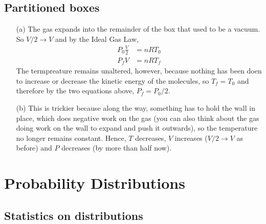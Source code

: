 \documentclass{article}
\begin{document}
\subsection{Partitioned boxes}

\begin{itemize}
	\item[(a)] The gas expands into the remainder of the box that used to be a vacuum. So $V/2\rightarrow V$ and by the Ideal Gas Law,
	\begin{align*}
	P_0\frac{V}{2}&=nRT_0 \\
	P_fV &= nRT_f
	\end{align*}
	The termpreature remains unaltered, however, because nothing has been doen to increase or decrease the kinetic energy of the molecules, so $T_f=T_0$ and therefore by the two equations above, $P_f=P_0/2$.
	\item[(b)] This is trickier because along the way, something has to hold the wall in place, which does negative work on the gas (you can also think about the gas doing work on the wall to expand and push it outwards), so the temperature no longer remains constant. Hence, $T$ decreases, $V$ increases ($V/2\rightarrow V$ as before) and $P$ decreases (by more than half now).
\end{itemize}

\newpage

\section{Probability Distributions}

\subsection{Statistics on distributions}
\end{document}
